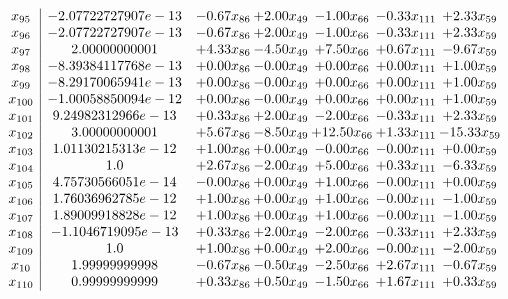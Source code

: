 \documentclass[8pt]{article}
\begin{document}
\[\begin{array}{c| c c@{\hskip 2pt} c@{\hskip 2pt} c@{\hskip 2pt} c@{\hskip 2pt} c@{\hskip 2pt} }
 x_{95}   &  -2.07722727907e-13 & -0.67 x_{86} & +  2.00 x_{49} & -1.00 x_{66} & -0.33 x_{111} & +  2.33 x_{59}\\
 x_{96}   &  -2.07722727907e-13 & -0.67 x_{86} & +  2.00 x_{49} & -1.00 x_{66} & -0.33 x_{111} & +  2.33 x_{59}\\
 x_{97}   &  2.00000000001 & +  4.33 x_{86} & -4.50 x_{49} & +  7.50 x_{66} & +  0.67 x_{111} & -9.67 x_{59}\\
 x_{98}   &  -8.39384117768e-13 & +  0.00 x_{86} & -0.00 x_{49} & +  0.00 x_{66} & +  0.00 x_{111} & +  1.00 x_{59}\\
 x_{99}   &  -8.29170065941e-13 & +  0.00 x_{86} & -0.00 x_{49} & +  0.00 x_{66} & +  0.00 x_{111} & +  1.00 x_{59}\\
 x_{100}   &  -1.00058850094e-12 & +  0.00 x_{86} & -0.00 x_{49} & +  0.00 x_{66} & +  0.00 x_{111} & +  1.00 x_{59}\\
 x_{101}   &  9.24982312966e-13 & +  0.33 x_{86} & +  2.00 x_{49} & -2.00 x_{66} & -0.33 x_{111} & +  2.33 x_{59}\\
 x_{102}   &  3.00000000001 & +  5.67 x_{86} & -8.50 x_{49} & + 12.50 x_{66} & +  1.33 x_{111} & -15.33 x_{59}\\
 x_{103}   &  1.01130215313e-12 & +  1.00 x_{86} & +  0.00 x_{49} & -0.00 x_{66} & -0.00 x_{111} & +  0.00 x_{59}\\
 x_{104}   &  1.0 & +  2.67 x_{86} & -2.00 x_{49} & +  5.00 x_{66} & +  0.33 x_{111} & -6.33 x_{59}\\
 x_{105}   &  4.75730566051e-14 & -0.00 x_{86} & +  0.00 x_{49} & +  1.00 x_{66} & -0.00 x_{111} & +  0.00 x_{59}\\
 x_{106}   &  1.76036962785e-12 & +  1.00 x_{86} & +  0.00 x_{49} & +  1.00 x_{66} & -0.00 x_{111} & -1.00 x_{59}\\
 x_{107}   &  1.89009918828e-12 & +  1.00 x_{86} & +  0.00 x_{49} & +  1.00 x_{66} & -0.00 x_{111} & -1.00 x_{59}\\
 x_{108}   &  -1.1046719095e-13 & +  0.33 x_{86} & +  2.00 x_{49} & -2.00 x_{66} & -0.33 x_{111} & +  2.33 x_{59}\\
 x_{109}   &  1.0 & +  1.00 x_{86} & +  0.00 x_{49} & +  2.00 x_{66} & -0.00 x_{111} & -2.00 x_{59}\\
 x_{10}   &  1.99999999998 & -0.67 x_{86} & -0.50 x_{49} & -2.50 x_{66} & +  2.67 x_{111} & -0.67 x_{59}\\
 x_{110}   &  0.99999999999 & +  0.33 x_{86} & +  0.50 x_{49} & -1.50 x_{66} & +  1.67 x_{111} & +  0.33 x_{59}\\

\end{array}\]
\end{document}
